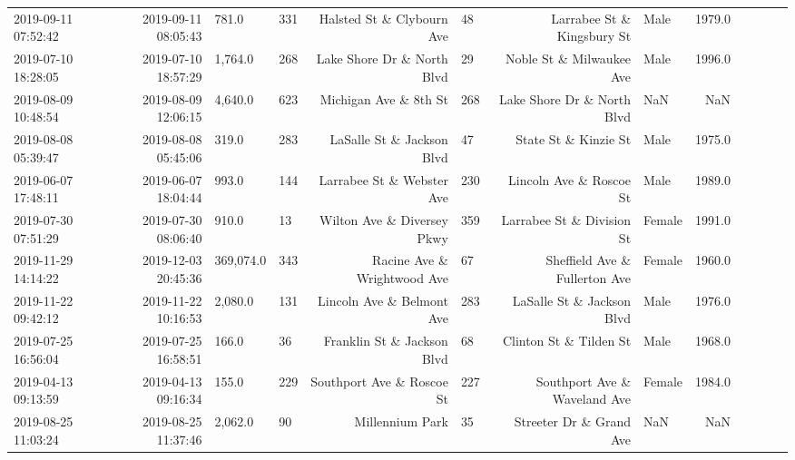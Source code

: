 \begin{table}[H]
{\begin{tabular}{lrllrlrlrlllr}
 2019-09-11 07:52:42 &  2019-09-11 08:05:43 &        781.0 &              331 &             Halsted St \& Clybourn Ave &             48 &            Larrabee St \& Kingsbury St &    Male &     1979.0 \\
 2019-07-10 18:28:05 &  2019-07-10 18:57:29 &      1,764.0 &              268 &            Lake Shore Dr \& North Blvd &             29 &              Noble St \& Milwaukee Ave &    Male &     1996.0 \\
 2019-08-09 10:48:54 &  2019-08-09 12:06:15 &      4,640.0 &              623 &                 Michigan Ave \& 8th St &            268 &            Lake Shore Dr \& North Blvd &     NaN &        NaN \\
 2019-08-08 05:39:47 &  2019-08-08 05:45:06 &        319.0 &              283 &             LaSalle St \& Jackson Blvd &             47 &                  State St \& Kinzie St &    Male &     1975.0 \\
 2019-06-07 17:48:11 &  2019-06-07 18:04:44 &        993.0 &              144 &             Larrabee St \& Webster Ave &            230 &               Lincoln Ave \& Roscoe St &    Male &     1989.0 \\
 2019-07-30 07:51:29 &  2019-07-30 08:06:40 &        910.0 &               13 &            Wilton Ave \& Diversey Pkwy &            359 &             Larrabee St \& Division St &  Female &     1991.0 \\
 2019-11-29 14:14:22 &  2019-12-03 20:45:36 &    369,074.0 &              343 &           Racine Ave \& Wrightwood Ave &             67 &         Sheffield Ave \& Fullerton Ave &  Female &     1960.0 \\
 2019-11-22 09:42:12 &  2019-11-22 10:16:53 &      2,080.0 &              131 &             Lincoln Ave \& Belmont Ave &            283 &             LaSalle St \& Jackson Blvd &    Male &     1976.0 \\
 2019-07-25 16:56:04 &  2019-07-25 16:58:51 &        166.0 &               36 &            Franklin St \& Jackson Blvd &             68 &                Clinton St \& Tilden St &    Male &     1968.0 \\
 2019-04-13 09:13:59 &  2019-04-13 09:16:34 &        155.0 &              229 &             Southport Ave \& Roscoe St &            227 &          Southport Ave \& Waveland Ave &  Female &     1984.0 \\
 2019-08-25 11:03:24 &  2019-08-25 11:37:46 &      2,062.0 &               90 &                       Millennium Park &             35 &               Streeter Dr \& Grand Ave &     NaN &        NaN \\

\end{tabular}}
\end{table}
